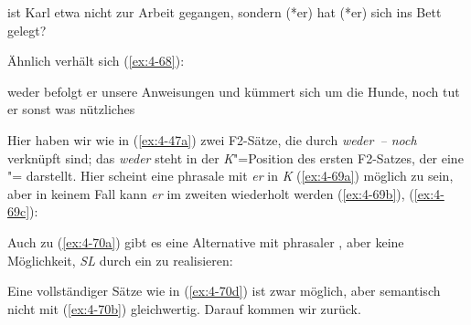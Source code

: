 \documentclass[output=paper]{langsci/langscibook}
\begin{document}
\begin{exe}
\ex%
\label{ex:4-67}
ist Karl etwa nicht zur Arbeit gegangen, sondern (*er) hat (*er) sich ins Bett gelegt?
\end{exe}
Ähnlich verhält sich (\ref{ex:4-68}):

\begin{exe}
\ex%
\label{ex:4-68}
weder befolgt er unsere Anweisungen und kümmert sich um die Hunde, noch tut er sonst was nützliches
\end{exe}
Hier haben wir wie in (\ref{ex:4-47a}) zwei F2-Sätze, die durch \textit{weder~-- noch} verknüpft sind; das \textit{weder} steht in der \textit{K}{}"=Position des ersten F2-Satzes, der eine "= darstellt. Hier scheint eine phrasale  mit \textit{er} in \textit{K} (\ref{ex:4-69a}) möglich zu sein, aber in keinem Fall kann \textit{er} im zweiten  wiederholt werden (\ref{ex:4-69b}), (\ref{ex:4-69c}):
\begin{exe}
\ex
\label{ex:4-69}
\begin{xlist}



\end{xlist}
\end{exe}
Auch zu (\ref{ex:4-70a}) gibt es eine Alternative mit phrasaler , aber keine Möglichkeit, \textit{SL} durch ein  zu realisieren:

\begin{exe}
\ex
\label{ex:4-70}
\begin{xlist}



\end{xlist}
\end{exe}
Eine  vollständiger Sätze wie in (\ref{ex:4-70d}) ist zwar möglich, aber semantisch nicht mit (\ref{ex:4-70b}) gleichwertig. Darauf kommen wir zurück.
\end{document}
